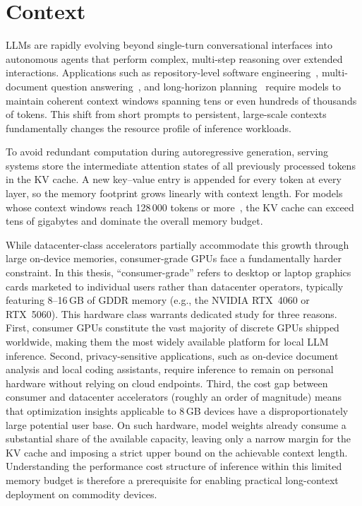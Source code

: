 \documentclass[
english,                 %
bibtex,                  %
]{kththesis}
\numberwithin{listing}{chapter}
\begin{document}
\section{Context}
\label{sec:Context}
\glspl{LLM} are rapidly evolving beyond single-turn conversational interfaces into autonomous agents that perform complex, multi-step reasoning over extended interactions. Applications such as repository-level software engineering~\cite{jimenez2024swebench}, multi-document question answering~\cite{liu2024lost}, and long-horizon planning~\cite{wang2023voyager} require models to maintain coherent context windows spanning tens or even hundreds of thousands of tokens. This shift from short prompts to persistent, large-scale contexts fundamentally changes the resource profile of inference workloads.

To avoid redundant computation during autoregressive generation, serving systems store the intermediate attention states of all previously processed tokens in the \gls{KV} cache. A new key--value entry is appended for every token at every layer, so the memory footprint grows linearly with context length. For models whose context windows reach 128\,000 tokens or more~\cite{dubey2024llama3, reid2024gemini}, the \gls{KV} cache can exceed tens of gigabytes and dominate the overall memory budget.

While datacenter-class accelerators partially accommodate this growth through large on-device memories, consumer-grade \glspl{GPU} face a fundamentally harder constraint. In this thesis, ``consumer-grade'' refers to desktop or laptop graphics cards marketed to individual users rather than datacenter operators, typically featuring 8--16\,GB of GDDR memory (e.g., the NVIDIA RTX~4060 or RTX~5060). This hardware class warrants dedicated study for three reasons. First, consumer \glspl{GPU} constitute the vast majority of discrete \glspl{GPU} shipped worldwide, making them the most widely available platform for local \gls{LLM} inference. Second, privacy-sensitive applications, such as on-device document analysis and local coding assistants, require inference to remain on personal hardware without relying on cloud endpoints. Third, the cost gap between consumer and datacenter accelerators (roughly an order of magnitude) means that optimization insights applicable to 8\,GB devices have a disproportionately large potential user base. On such hardware, model weights already consume a substantial share of the available capacity, leaving only a narrow margin for the \gls{KV} cache and imposing a strict upper bound on the achievable context length. Understanding the performance cost structure of inference within this limited memory budget is therefore a prerequisite for enabling practical long-context deployment on commodity devices.
\end{document}
